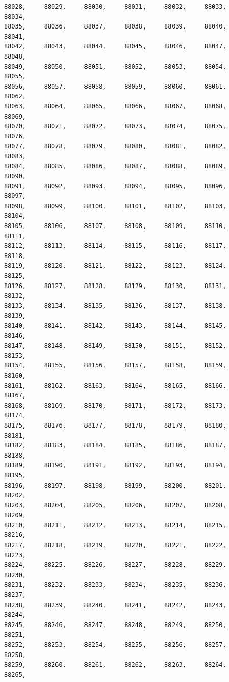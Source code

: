\documentclass[a4paper,11pt]{report}
\begin{document}
\begin{verbatim}
88028,     88029,     88030,     88031,     88032,     88033,     88034,     
88035,     88036,     88037,     88038,     88039,     88040,     88041,     
88042,     88043,     88044,     88045,     88046,     88047,     88048,     
88049,     88050,     88051,     88052,     88053,     88054,     88055,     
88056,     88057,     88058,     88059,     88060,     88061,     88062,     
88063,     88064,     88065,     88066,     88067,     88068,     88069,     
88070,     88071,     88072,     88073,     88074,     88075,     88076,     
88077,     88078,     88079,     88080,     88081,     88082,     88083,     
88084,     88085,     88086,     88087,     88088,     88089,     88090,     
88091,     88092,     88093,     88094,     88095,     88096,     88097,     
88098,     88099,     88100,     88101,     88102,     88103,     88104,     
88105,     88106,     88107,     88108,     88109,     88110,     88111,     
88112,     88113,     88114,     88115,     88116,     88117,     88118,     
88119,     88120,     88121,     88122,     88123,     88124,     88125,     
88126,     88127,     88128,     88129,     88130,     88131,     88132,     
88133,     88134,     88135,     88136,     88137,     88138,     88139,     
88140,     88141,     88142,     88143,     88144,     88145,     88146,     
88147,     88148,     88149,     88150,     88151,     88152,     88153,     
88154,     88155,     88156,     88157,     88158,     88159,     88160,     
88161,     88162,     88163,     88164,     88165,     88166,     88167,     
88168,     88169,     88170,     88171,     88172,     88173,     88174,     
88175,     88176,     88177,     88178,     88179,     88180,     88181,     
88182,     88183,     88184,     88185,     88186,     88187,     88188,     
88189,     88190,     88191,     88192,     88193,     88194,     88195,     
88196,     88197,     88198,     88199,     88200,     88201,     88202,     
88203,     88204,     88205,     88206,     88207,     88208,     88209,     
88210,     88211,     88212,     88213,     88214,     88215,     88216,     
88217,     88218,     88219,     88220,     88221,     88222,     88223,     
88224,     88225,     88226,     88227,     88228,     88229,     88230,     
88231,     88232,     88233,     88234,     88235,     88236,     88237,     
88238,     88239,     88240,     88241,     88242,     88243,     88244,     
88245,     88246,     88247,     88248,     88249,     88250,     88251,     
88252,     88253,     88254,     88255,     88256,     88257,     88258,     
88259,     88260,     88261,     88262,     88263,     88264,     88265,     

\end{verbatim}
\end{document}
